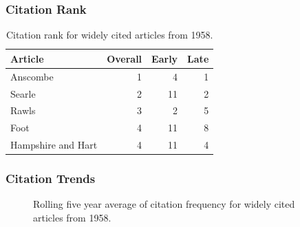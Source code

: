 \documentclass[
  10pt,
  letterpaper,
  DIV=11,
  numbers=noendperiod,
  twoside]{scrartcl}
\begin{document}
\subsubsection*{Citation Rank}\label{sec-rank-1958}

\begin{longtable}[]{@{}lrrr@{}}

\caption{\label{tbl-citation-rank-1958}Citation rank for widely cited
articles from 1958.}

\tabularnewline

\toprule\noalign{}
Article & Overall & Early & Late \\
\midrule\noalign{}
\endhead
\bottomrule\noalign{}
\endlastfoot
Anscombe & 1 & 4 & 1 \\
Searle & 2 & 11 & 2 \\
Rawls & 3 & 2 & 5 \\
Foot & 4 & 11 & 8 \\
Hampshire and Hart & 4 & 11 & 4 \\

\end{longtable}

\subsubsection*{Citation Trends}\label{sec-trends-1958}

\begin{figure}


\caption{\label{fig-citation-spaghetti-1958}Rolling five year average of
citation frequency for widely cited articles from 1958.}

\end{figure}%
\end{document}
